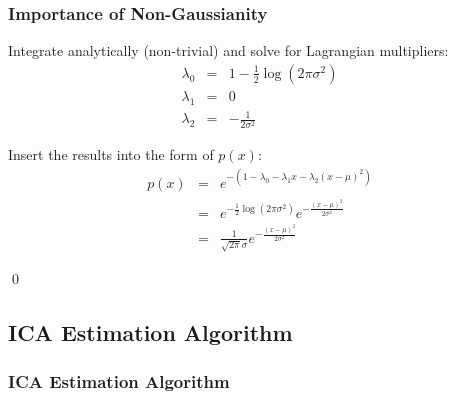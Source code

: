 \begin{frame}
  \frametitle{Importance of Non-Gaussianity \cont}

  Integrate analytically (non-trivial) and solve for Lagrangian multipliers:
  \begin{eqnarray*}
    \lambda_0 &=& 1 - \frac{1}{2} \log(2 \pi \sigma^2 ) \\
    \lambda_1 &=& 0 \\
    \lambda_2 &=& - \frac{1}{2 \sigma^2}  
  \end{eqnarray*}
  \pspread

  Insert the results into the form of $p(x)$:
  \begin{eqnarray*}
    p(x) &=& e^{-(1 - \lambda_0 - \lambda_1 x - \lambda_2 (x-\mu)^2)} \\
         &=& e^{-\frac{1}{2} \log(2 \pi \sigma^2)} e^{-\frac{(x-\mu)^2}{2 \sigma^2}} \\
         &=& \frac{1}{\sqrt{2 \pi} \sigma} e^{- \frac{(x-\mu)^2}{2 \sigma^2}}
  \end{eqnarray*}

  \hfill \qed
\end{frame}


\subsection{ICA Estimation Algorithm}

\begin{frame}
  \frametitle{ICA Estimation Algorithm}

  
  \begin{centernss}
  \end{centernss}

\end{frame}


